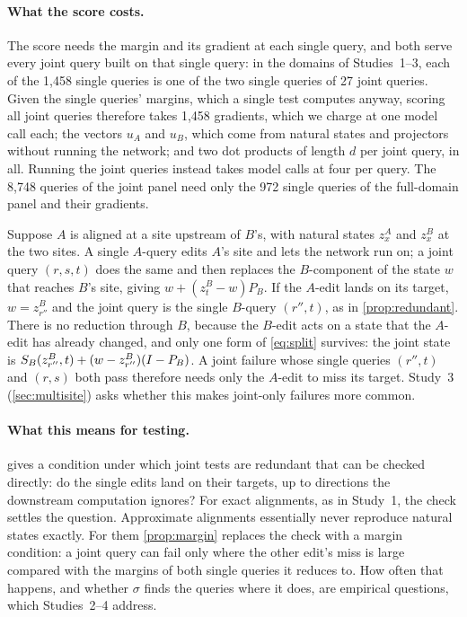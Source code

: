 \paragraph{What the score costs.}
The score needs the margin and its gradient at each single query, and both serve every joint query built on that single query: in the domains of Studies~1--3, each of the 1,458 single queries is one of the two single queries of 27 joint queries. Given the
single queries' margins, which a single test computes anyway, scoring all \ExJointQueries{} joint queries therefore
takes 1,458 gradients, which we charge at one model call each; the vectors $u_A$ and $u_B$, which come from natural
states and projectors without running the network; and two dot products of length $d$ per joint query,
\CostDotProducts{} in all. Running the joint queries instead takes \CostJointCalls{} model calls at four per query. The
8,748 queries of the joint panel need only the 972 single queries of the full-domain panel and their gradients.

\begin{remark}\label{rem:sites}
Suppose $A$ is aligned at a site upstream of $B$'s, with natural states $z^A_x$ and $z^B_x$ at the two sites. A single
$A$-query edits $A$'s site and lets the network run on; a joint query $(r,s,t)$ does the same and then replaces the
$B$-component of the state $w$ that reaches $B$'s site, giving $w+(z^B_t-w)P_B$. If the $A$-edit lands on its
target, $w=z^B_{r''}$ and the joint query is the single $B$-query $(r'',t)$, as in \cref{prop:redundant}. There is no
reduction through $B$, because the $B$-edit acts on a state that the $A$-edit has already changed, and only one form
of \cref{eq:split} survives: the joint state is $S_B(z^B_{r''},t)+(w-z^B_{r''})(I-P_B)$. A joint failure whose single
queries $(r'',t)$ and $(r,s)$ both pass therefore needs only the $A$-edit to miss its target. Study~3
(\cref{sec:multisite}) asks whether this makes joint-only failures more common.
\end{remark}

\paragraph{What this means for testing.}
 gives a condition under which joint tests are redundant that can be checked directly: do the
single edits land on their targets, up to directions the downstream computation ignores? For exact alignments, as
in Study~1, the check settles the question. Approximate alignments essentially never reproduce natural states
exactly. For them \cref{prop:margin} replaces the check with a margin condition: a joint query can fail only where
the other edit's miss is large compared with the margins of both single queries it reduces to. How often that happens,
and whether $\sigma$ finds the queries where it does, are empirical questions, which Studies~2--4 address.
